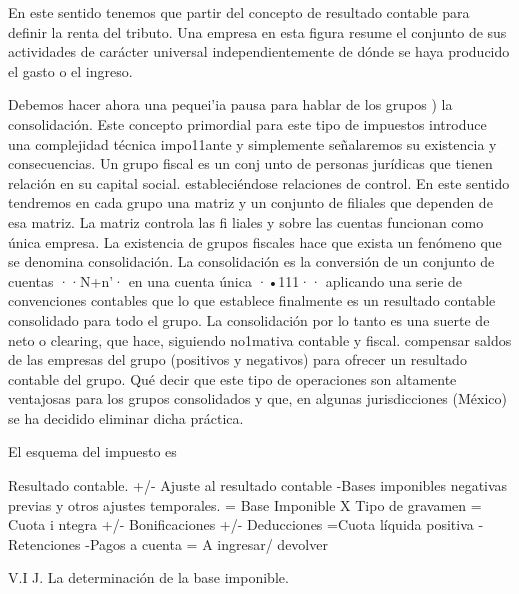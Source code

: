 \documentclass[10pt,a4paper]{article}
\begin{document}
En este sentido tenemos que partir del concepto de resultado contable para definir la renta del tributo. Una empresa en esta figura resume el conjunto de sus actividades de carácter universal independientemente de dónde se haya producido el gasto o el ingreso.

Debemos hacer ahora una pequei'ia pausa para hablar de los grupos ) la consolidación. Este concepto primordial para este tipo de impuestos introduce una complejidad técnica impo11ante y simplemente señalaremos su existencia y consecuencias. Un grupo fiscal es un conj unto de personas jurídicas que tienen relación en su capital social. estableciéndose relaciones de control. En este sentido tendremos en cada grupo una matriz y un conjunto de filiales que dependen de esa matriz. La matriz controla las fi liales y sobre las cuentas funcionan como única empresa. La existencia de grupos fiscales hace que exista un fenómeno que se denomina consolidación. La consolidación es la conversión de un conjunto de cuentas ··N+n'· en una cuenta única ·•111·· aplicando una serie de convenciones contables que lo que establece finalmente es un resultado contable consolidado para todo el grupo. La consolidación por lo tanto es una suerte de neto o clearing, que hace, siguiendo no1mativa contable y fiscal. compensar saldos de las empresas del grupo (positivos y negativos) para ofrecer un resultado contable del grupo. Qué decir que este tipo de operaciones son altamente ventajosas para los grupos consolidados y que, en algunas jurisdicciones (México) se ha decidido eliminar dicha práctica.

El esquema del impuesto es

Resultado contable.
+/- Ajuste al resultado contable
-Bases imponibles negativas previas y otros ajustes temporales.
= Base Imponible
X Tipo de gravamen
= Cuota i ntegra
+/- Bonificaciones
+/- Deducciones
=Cuota líquida positiva
-Retenciones
-Pagos a cuenta
= A ingresar/ devolver

V.I J. La determinación de la base imponible.
\end{document}
